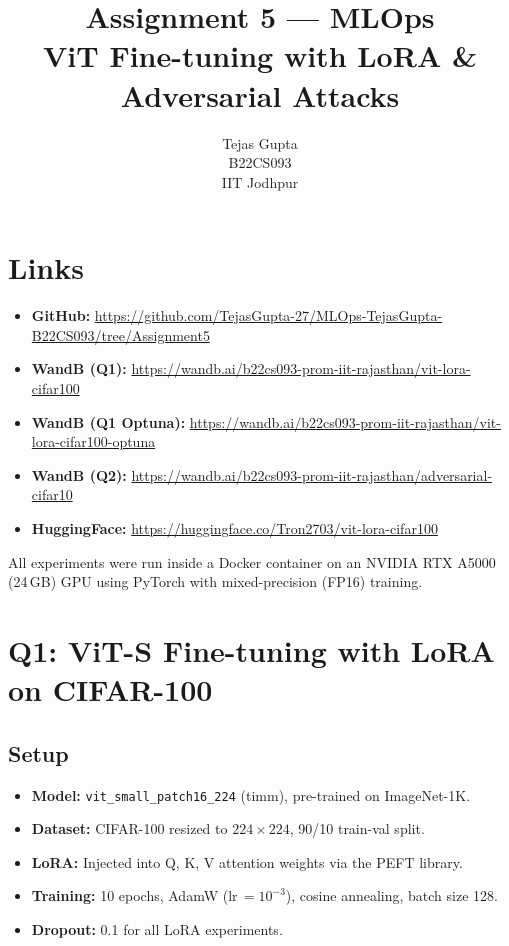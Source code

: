 \documentclass[12pt,a4paper]{article}
\title{\textbf{Assignment 5 --- MLOps} \\ ViT Fine-tuning with LoRA \& Adversarial Attacks}
\author{Tejas Gupta \\ B22CS093 \\ IIT Jodhpur}
\date{}
\begin{document}
\maketitle

\section*{Links}
\begin{itemize}
    \item \textbf{GitHub:} \url{https://github.com/TejasGupta-27/MLOps-TejasGupta-B22CS093/tree/Assignment5}
    \item \textbf{WandB (Q1):} \url{https://wandb.ai/b22cs093-prom-iit-rajasthan/vit-lora-cifar100}
    \item \textbf{WandB (Q1 Optuna):} \url{https://wandb.ai/b22cs093-prom-iit-rajasthan/vit-lora-cifar100-optuna}
    \item \textbf{WandB (Q2):} \url{https://wandb.ai/b22cs093-prom-iit-rajasthan/adversarial-cifar10}
    \item \textbf{HuggingFace:} \url{https://huggingface.co/Tron2703/vit-lora-cifar100}
\end{itemize}

All experiments were run inside a Docker container on an NVIDIA RTX A5000 (24\,GB) GPU using PyTorch with mixed-precision (FP16) training.

\section{Q1: ViT-S Fine-tuning with LoRA on CIFAR-100}

\subsection{Setup}
\begin{itemize}
    \item \textbf{Model:} \texttt{vit\_small\_patch16\_224} (timm), pre-trained on ImageNet-1K.
    \item \textbf{Dataset:} CIFAR-100 resized to $224\times224$, 90/10 train-val split.
    \item \textbf{LoRA:} Injected into Q, K, V attention weights via the PEFT library.
    \item \textbf{Training:} 10 epochs, AdamW (lr\,$=10^{-3}$), cosine annealing, batch size 128.
    \item \textbf{Dropout:} 0.1 for all LoRA experiments.
\end{itemize}
\end{document}
